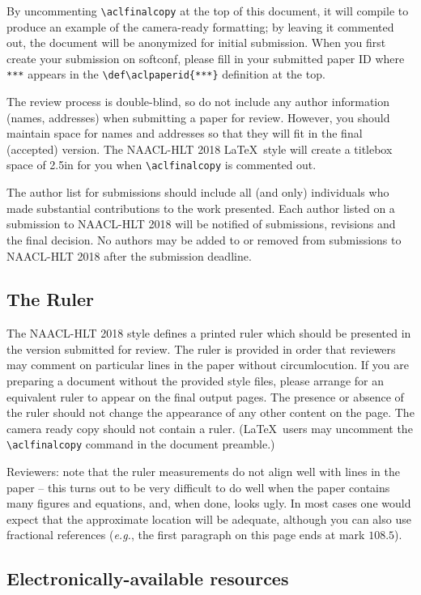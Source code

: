 By uncommenting {\small\verb|\aclfinalcopy|} at the top of this 
 document, it will compile to produce an example of the camera-ready formatting; by leaving it commented out, the document will be anonymized for initial submission.  When you first create your submission on softconf, please fill in your submitted paper ID where {\small\verb|***|} appears in the {\small\verb|\def\aclpaperid{***}|} definition at the top.

The review process is double-blind, so do not include any author information (names, addresses) when submitting a paper for review.  
However, you should maintain space for names and addresses so that they will fit in the final (accepted) version.  The NAACL-HLT 2018 \LaTeX\ style will create a titlebox space of 2.5in for you when {\small\verb|\aclfinalcopy|} is commented out.  

The author list for submissions should include all (and only) individuals who made substantial contributions to the work presented. Each author listed on a submission to NAACL-HLT 2018 will be notified of submissions, revisions and the final decision. No authors may be added to or removed from submissions to NAACL-HLT 2018 after the submission deadline.

\subsection{The Ruler}
The NAACL-HLT 2018 style defines a printed ruler which should be presented in the
version submitted for review.  The ruler is provided in order that
reviewers may comment on particular lines in the paper without
circumlocution.  If you are preparing a document without the provided
style files, please arrange for an equivalent ruler to
appear on the final output pages.  The presence or absence of the ruler
should not change the appearance of any other content on the page.  The
camera ready copy should not contain a ruler. (\LaTeX\ users may uncomment the {\small\verb|\aclfinalcopy|} command in the document preamble.)  

Reviewers: note that the ruler measurements do not align well with
lines in the paper -- this turns out to be very difficult to do well
when the paper contains many figures and equations, and, when done,
looks ugly. In most cases one would expect that the approximate
location will be adequate, although you can also use fractional
references ({\em e.g.}, the first paragraph on this page ends at mark $108.5$).

\subsection{Electronically-available resources}

